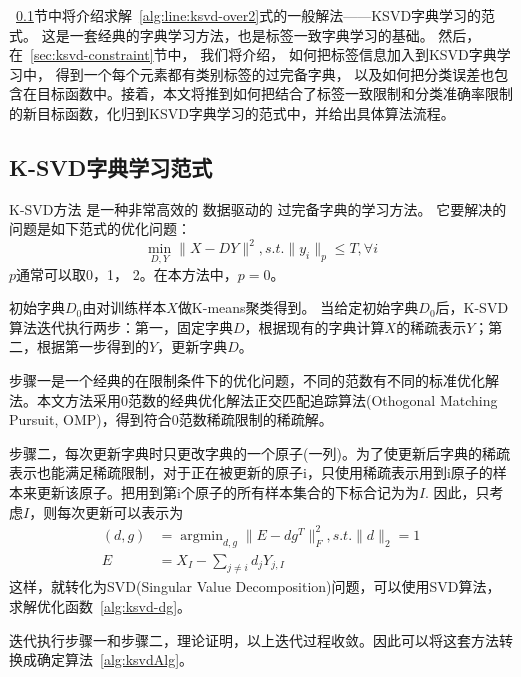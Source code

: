     ~\ref{sec:lsvd-lasso}节中将介绍求解~\ref{alg:line:ksvd-over2}式的一般解法——KSVD字典学习的范式。 这是一套经典的字典学习方法，也是标签一致字典学习的基础。 然后， 在~\ref{sec:ksvd-constraint}节中，  我们将介绍， 如何把标签信息加入到KSVD字典学习中，  得到一个每个元素都有类别标签的过完备字典\cite{jiang2013label}， 以及如何把分类误差也包含在目标函数中。接着，本文将推到如何把结合了标签一致限制和分类准确率限制的新目标函数，化归到KSVD字典学习的范式中，并给出具体算法流程。


    \subsection{K-SVD字典学习范式} 
    \label{sec:lsvd-lasso}
    K-SVD方法 \cite{aharon2006rm}是一种非常高效的 数据驱动的 过完备字典的学习方法。  它要解决的问题是如下范式的优化问题：
    \begin{equation}
    \label{alg:ksvd-lasso}
        \min _{D, Y} \| X - DY \| ^2 , s.t. \| y_i \| _p \le T, \forall i
    \end{equation}
    $p$通常可以取0，1， 2。在本方法中，$p = 0$。

    初始字典$D_0$由对训练样本$X$做K-means\cite{kanungo2002efficient}聚类得到。
    当给定初始字典$D_0$后，K-SVD算法迭代执行两步：第一，固定字典$D$，根据现有的字典计算$X$的稀疏表示$Y$；第二，根据第一步得到的$Y$，更新字典$D$。

    步骤一是一个经典的在限制条件下的优化问题，不同的范数有不同的标准优化解法。本文方法采用0范数的经典优化解法正交匹配追踪算法(Othogonal Matching Pursuit, OMP)\cite{pati1993orthogonal}，得到符合0范数稀疏限制的稀疏解。

    步骤二，每次更新字典时只更改字典的一个原子(一列)。为了使更新后字典的稀疏表示也能满足稀疏限制，对于正在被更新的原子i，只使用稀疏表示用到i原子的样本来更新该原子。把用到第i个原子的所有样本集合的下标合记为为$I$. 因此，只考虑$I$，则每次更新可以表示为
    \begin{equation}
    \label{alg:ksvd-dg}
    \begin{split}
    (d, g) &= \mathop{\arg \min}_{d, g}\|E - d g^T\| ^2 _F, s.t.\|d\|_ 2 = 1 \\
    E &= X_I - \sum _{j\ne i} d_j Y_{j, I}
    \end{split}
    \end{equation}
    这样，就转化为SVD(Singular Value Decomposition)问题，可以使用SVD算法，求解优化函数~\ref{alg:ksvd-dg}。

    迭代执行步骤一和步骤二，理论证明\cite{aharon2006rm}，以上迭代过程收敛。因此可以将这套方法转换成确定算法~\ref{alg:ksvdAlg}。

